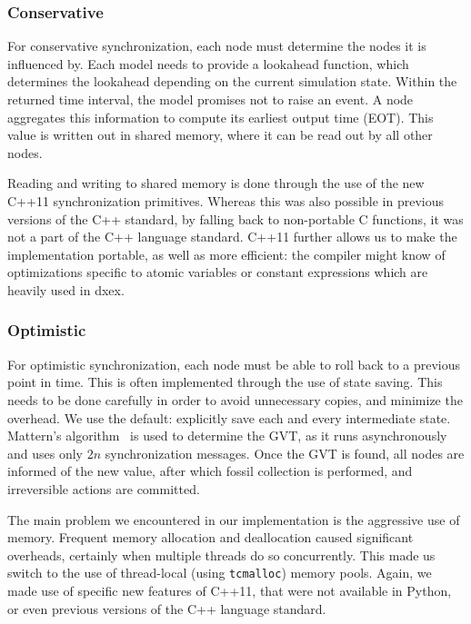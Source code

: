 \subsubsection{Conservative}
For conservative synchronization, each node must determine the nodes it is influenced by.
Each model needs to provide a lookahead function, which determines the lookahead depending on the current simulation state.
Within the returned time interval, the model promises not to raise an event.
A node aggregates this information to compute its earliest output time (EOT).
This value is written out in shared memory, where it can be read out by all other nodes.

Reading and writing to shared memory is done through the use of the new C++11 synchronization primitives.
Whereas this was also possible in previous versions of the C++ standard, by falling back to non-portable C functions, it was not a part of the C++ language standard.
C++11 further allows us to make the implementation portable, as well as more efficient: the compiler might know of optimizations specific to atomic variables or constant expressions which are heavily used in dxex.

\subsubsection{Optimistic}
For optimistic synchronization, each node must be able to roll back to a previous point in time.
This is often implemented through the use of state saving.
This needs to be done carefully in order to avoid unnecessary copies, and minimize the overhead.
We use the default: explicitly save each and every intermediate state.
Mattern's algorithm~\cite{mattern} is used to determine the GVT, as it runs asynchronously and uses only $2n$ synchronization messages.
Once the GVT is found, all nodes are informed of the new value, after which fossil collection is performed, and irreversible actions are committed.

The main problem we encountered in our implementation is the aggressive use of memory.
Frequent memory allocation and deallocation caused significant overheads, certainly when multiple threads do so concurrently.
This made us switch to the use of thread-local (using \texttt{tcmalloc}) memory pools.
Again, we made use of specific new features of C++11, that were not available in Python, or even previous versions of the C++ language standard.

